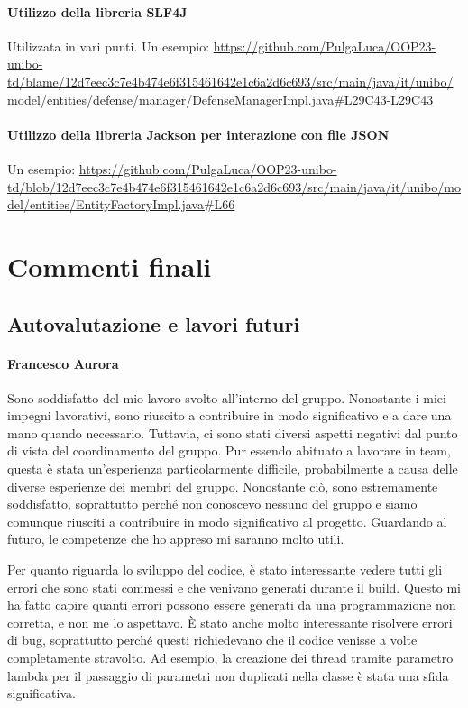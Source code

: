 \documentclass[a4paper,12pt]{report}
\begin{document}
\subsubsection{Utilizzo della libreria SLF4J}
Utilizzata in vari punti. Un esempio:  
\url{https://github.com/PulgaLuca/OOP23-unibo-td/blame/12d7eec3c7e4b474e6f315461642e1c6a2d6c693/src/main/java/it/unibo/model/entities/defense/manager/DefenseManagerImpl.java#L29C43-L29C43}

\subsubsection{Utilizzo della libreria Jackson per interazione con file JSON}
Un esempio:  
\url{https://github.com/PulgaLuca/OOP23-unibo-td/blob/12d7eec3c7e4b474e6f315461642e1c6a2d6c693/src/main/java/it/unibo/model/entities/EntityFactoryImpl.java#L66}



\chapter{Commenti finali}
\section{Autovalutazione e lavori futuri}
\subsubsection{Francesco Aurora}
Sono soddisfatto del mio lavoro svolto all'interno del gruppo. Nonostante i miei impegni lavorativi, sono riuscito a contribuire in modo significativo e a dare una mano quando necessario. Tuttavia, ci sono stati diversi aspetti negativi dal punto di vista del coordinamento del gruppo. Pur essendo abituato a lavorare in team, questa è stata un'esperienza particolarmente difficile, probabilmente a causa delle diverse esperienze dei membri del gruppo. Nonostante ciò, sono estremamente soddisfatto, soprattutto perché non conoscevo nessuno del gruppo e siamo comunque riusciti a contribuire in modo significativo al progetto. Guardando al futuro, le competenze che ho appreso mi saranno molto utili.

Per quanto riguarda lo sviluppo del codice, è stato interessante vedere tutti gli errori che sono stati commessi e che venivano generati durante il build. Questo mi ha fatto capire quanti errori possono essere generati da una programmazione non corretta, e non me lo aspettavo. È stato anche molto interessante risolvere errori di bug, soprattutto perché questi richiedevano che il codice venisse a volte completamente stravolto. Ad esempio, la creazione dei thread tramite parametro lambda per il passaggio di parametri non duplicati nella classe è stata una sfida significativa.
\end{document}

